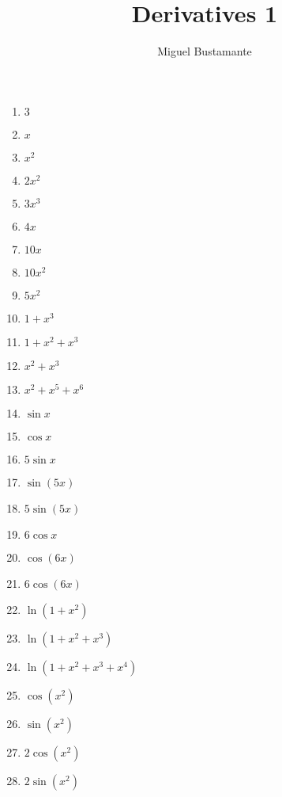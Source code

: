 \documentclass{article}
\title{Derivatives 1}
\author{Miguel Bustamante}
\begin{document}
\maketitle
\begin{multicols}{3}
\begin{enumerate}
    \item $3$
    \item $x$
    \item $x^2$
    \item $2x^2$
    \item $3x^3$
    \item $4x$
    \item $10x$
    \item $10x^2$
    \item $5x^2$
    \item $1+x^3$
    \item $1+x^2+x^3$
    \item $x^2+x^3$
    \item $x^2+x^5+x^6$
    \item $\sin x$
    \item $\cos x$
    \item $5\sin x$
    \item $\sin(5x)$
    \item $5\sin(5x)$
    \item $6\cos x$
    \item $\cos(6x)$
    \item $6\cos(6x)$
    \item $\ln(1+x^2)$
    \item $\ln(1+x^2+x^3)$
    \item $\ln(1+x^2+x^3+x^4)$
    \item $\cos(x^2)$
    \item $\sin(x^2)$
    \item $2\cos(x^2)$
    \item $2\sin(x^2)$
\end{enumerate}
\end{multicols}
\end{document}

